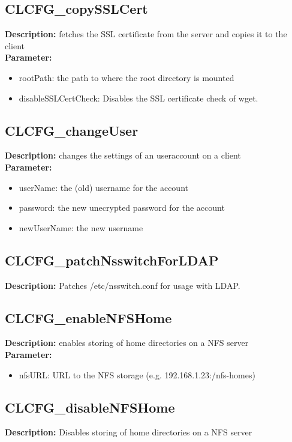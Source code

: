 \subsection{CLCFG\_copySSLCert}
\textbf{Description:} fetches the SSL certificate from the server and copies it to the client\\
\textbf{Parameter:}
\begin{itemize}
\item rootPath: the path to where the root directory is mounted
\item disableSSLCertCheck: Disables the SSL certificate check of wget.
\end{itemize}

\subsection{CLCFG\_changeUser}
\textbf{Description:} changes the settings of an useraccount on a client\\
\textbf{Parameter:}
\begin{itemize}
\item userName: the (old) username for the account
\item password: the new unecrypted password for the account
\item newUserName: the new username
\end{itemize}

\subsection{CLCFG\_patchNsswitchForLDAP}
\textbf{Description:} Patches /etc/nsswitch.conf for usage with LDAP.\\

\subsection{CLCFG\_enableNFSHome}
\textbf{Description:} enables storing of home directories on a NFS server\\
\textbf{Parameter:}
\begin{itemize}
\item nfsURL: URL to the NFS storage (e.g. 192.168.1.23:/nfs-homes)
\end{itemize}

\subsection{CLCFG\_disableNFSHome}
\textbf{Description:} Disables storing of home directories on a NFS server\\

